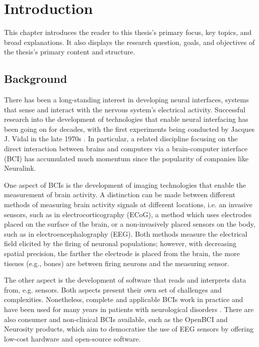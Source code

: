 \chapter{Introduction}
\graphicspath{{Chapter1/Figs/}{Chapter1/Figs/}}

This chapter introduces the reader to this thesis's primary focus, key topics, and broad explanations. It also displays the research question, goals, and objectives of the thesis's primary content and structure.

\section{Background}
\label{chapter1-background}

There has been a long-standing interest in developing neural interfaces, systems that sense and interact with the nervous system's electrical activity. Successful research into the development of technologies that enable neural interfacing has been going on for decades, with the first experiments being conducted by Jacques J. Vidal in the late 1970s \citep{vidal_real-time_1977}. In particular, a related discipline focusing on the direct interaction between brains and computers via a brain-computer interface (BCI) has accumulated much momentum since the popularity of companies like Neuralink.

One aspect of BCIs is the development of imaging technologies that enable the measurement of brain activity. A distinction can be made between different methods of measuring brain activity signals at different locations, i.e. an invasive sensors, such as in electrocorticography (ECoG), a method which uses electrodes placed on the surface of the brain, or a non-invasively placed sensors on the body, such as in electroencephalography (EEG). Both methods measure the electrical field elicited by the firing of neuronal populations; however, with decreasing spatial precision, the farther the electrode is placed from the brain, the more tissues (e.g., bones) are between firing neurons and the measuring sensor.

The other aspect is the development of software that reads and interprets data from, e.g. sensors. Both aspects present their own set of challenges and complexities. Nonetheless, complete and applicable BCIs work in practice and have been used for many years in patients with neurological disorders \citep{braingate_publications_nodate}. There are also consumer and non-clinical BCIs available, such as the OpenBCI and Neurosity products, which aim to democratise the use of EEG sensors by offering low-cost hardware and open-source software.

